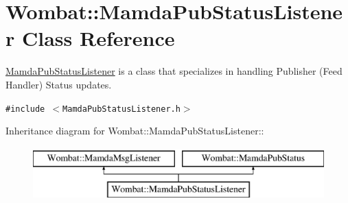 \hypertarget{classWombat_1_1MamdaPubStatusListener}{
\section{Wombat::Mamda\-Pub\-Status\-Listener Class Reference}
\label{classWombat_1_1MamdaPubStatusListener}
}
\hyperlink{classWombat_1_1MamdaPubStatusListener}{Mamda\-Pub\-Status\-Listener} is a class that specializes in handling Publisher (Feed Handler) Status updates.  


{\tt \#include $<$Mamda\-Pub\-Status\-Listener.h$>$}

Inheritance diagram for Wombat::Mamda\-Pub\-Status\-Listener::\begin{figure}[H]
\begin{center}
\leavevmode
\includegraphics[height=2cm]{classWombat_1_1MamdaPubStatusListener}
\end{center}
\end{figure}
